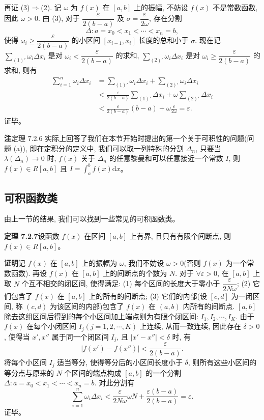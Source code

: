 \documentclass[UTF8, 12pt, fontset=fandol, oneside]{ctexart}
\begin{document}
再证 (3)$\Rightarrow$(2). 记 $\omega$ 为 $f(x)$ 在 $[a,b]$ 上的振幅, 不妨设 $f(x)$ 不是常数函数, 因此 $\omega>0$. 由 (3), 对于 $\dfrac{\varepsilon}{2(b-a)}$ 及 $\sigma=\dfrac{\varepsilon}{2\omega}$, 存在分割
\[
  \Delta:a=x_0<x_1<\cdots<x_n=b,
\]
使得 $\omega_i\geq\dfrac{\varepsilon}{2(b-a)}$ 的小区间 $[x_{i-1},x_i]$ 长度的总和小于 $\sigma$. 现在记 $\sum_{(1)'}\omega_i\Delta x_i$ 是对 $\omega_i<\dfrac{\varepsilon}{2(b-a)}$ 的求和, $\sum_{(2)'}\omega_i\Delta x_i$ 是对 $\omega_i\geq\dfrac{\varepsilon}{2(b-a)}$ 的求和, 则有
\[
\begin{aligned}
  \sum_{i=1}^n\omega_i\Delta x_i
  &=\sum_{(1)'}\omega_i\Delta x_i+\sum_{(2)'}\omega_i\Delta x_i\\
  &<\frac{\varepsilon}{2(b-a)}\sum_{(1)'}\Delta x_i+\omega\sum_{(2)'}\Delta x_i\\
  &<\frac{\varepsilon}{2(b-a)}(b-a)+\omega\frac{\varepsilon}{2\omega}
  =\varepsilon.
\end{aligned}
\]
证毕。

\noindent\textbf{注}\quad 定理 7.2.6 实际上回答了我们在本节开始时提出的第一个关于可积性的问题(问题 (a)), 即在定积分的定义中, 我们可以取一列特殊的分割 $\Delta_n$, 只要当 $\lambda(\Delta_n)\to0$ 时, $f(x)$ 关于 $\Delta_n$ 的任意黎曼和可以任意接近一个常数 $I$, 则 $f(x)\in R[a,b]$ 且 $I=\int_a^b f(x)\mathrm dx$。

\subsection{可积函数类}

由上一节的结果, 我们可以找到一些常见的可积函数类。

\noindent\textbf{定理 7.2.7}\quad 设函数 $f(x)$ 在区间 $[a,b]$ 上有界, 且只有有限个间断点, 则 $f(x)\in R[a,b]$。

\noindent\textbf{证明}\quad 记 $f(x)$ 在 $[a,b]$ 上的振幅为 $\omega$, 我们不妨设 $\omega>0$(否则 $f(x)$ 为一个常数函数). 再设 $f(x)$ 在 $[a,b]$ 上的间断点的个数为 $N$. 对于 $\forall\varepsilon>0$, 在 $[a,b]$ 上取 $N$ 个互不相交的闭区间, 使得满足: (1) 每个区间的长度大于零小于 $\dfrac{\varepsilon}{2N\omega}$; (2) 它们包含了 $f(x)$ 在 $[a,b]$ 上的所有的间断点; (3) 它们的内部(设 $[c,d]$ 为一闭区间, 称 $(c,d)$ 为该区间的内部)包含了 $f(x)$ 在 $(a,b)$ 内所有的间断点. $[a,b]$ 除去这组区间后得到的每个小区间加上端点则为有限个闭区间: $I_1,I_2,\cdots,I_K$. 由于 $f(x)$ 在每个小闭区间 $I_j(j=1,2,\cdots,K)$ 上连续, 从而一致连续, 因此存在 $\delta>0$, 使得当 $x',x''$ 属于同一个闭区间 $I_j$, 且 $|x'-x''|<\delta$ 时, 有
\[
  |f(x')-f(x'')|<\frac{\varepsilon}{2(b-a)}.
\]
将每个小区间 $I_j$ 适当等分, 使得等分后的小区间长度小于 $\delta$, 则所有这些小区间的等分点与原来的 $N$ 个区间的端点构成 $[a,b]$ 的一个分割 $\Delta:a=x_0<x_1<\cdots<x_n=b$. 对此分割有
\[
  \sum_{i=1}^n\omega_i\Delta x_i< \frac{\varepsilon}{2N\omega}\omega N+\frac{\varepsilon(b-a)}{2(b-a)}=\varepsilon.
\]
证毕。
\end{document}
